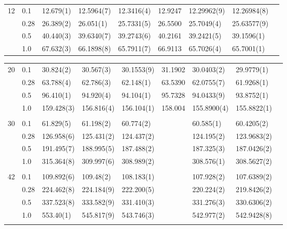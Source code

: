 {\begin{landscape}
\begin{table}
\begin{tabularx}{\hsize}{llR{2.65cm}R{2.65cm}R{2.65cm}R{2.65cm}R{2.65cm}R{2.65cm}R{2.65cm}}
				12 & 0.1 & 12.679(1) & 12.5964(7) & 12.3416(4) & 12.9247 & 12.29962(9) & 12.26984(8) \\ 
				& 0.28 & 26.389(2) & 26.051(1) & 25.7331(5) & 26.5500 & 25.7049(4) & 25.63577(9) \\
				& 0.5 & 40.440(3) & 39.6340(7) & 39.2743(6) & 40.2161 & 39.2421(5) & 39.1596(1) \\
				& 1.0 & 67.632(3) & 66.1898(8) & 65.7911(7) & 66.9113 & 65.7026(4) & 65.7001(1) \\ \hline
			\end{tabularx}
		\end{table}
		
		\begin{table}
			\label{tab:quantumdotswinteraction2D2}
			\begin{tabularx}{\hsize}{llR{2.65cm}R{2.65cm}R{2.65cm}R{2.65cm}R{2.65cm}R{2.65cm}R{2.65cm}} \\
				20 & 0.1 & 30.824(2) & 30.567(3) & 30.1553(9) & 31.1902 & 30.0403(2) & 29.9779(1) \\ 
				& 0.28 & 63.788(4) & 62.786(3) & 62.148(1) & 63.5390 & 62.0755(7) & 61.9268(1) \\
				& 0.5 & 96.410(1) & 94.920(4) & 94.104(1) & 95.7328 & 94.0433(9) & 93.8752(1) \\
				& 1.0 & 159.428(3) & 156.816(4) & 156.104(1) & 158.004 & 155.8900(4) & 155.8822(1) & \phantom{=} \\ 
				\hline \\
				
				30 & 0.1 & 61.829(5) & 61.198(2) & 60.774(2) & & 60.585(1) & 60.4205(2) \\ 
				& 0.28 & 126.958(6) & 125.431(2) & 124.437(2) & & 124.195(2) & 123.9683(2) \\
				& 0.5 & 191.495(7) & 188.995(5) & 187.488(2) & & 187.325(3) & 187.0426(2) \\
				& 1.0 & 315.364(8) & 309.997(6) & 308.989(2) & & 308.576(1) & 308.5627(2) \\ \hline \\
				
				42 & 0.1 & 109.892(6) & 109.48(2) & 108.183(1) & &  107.928(2) & 107.6389(2) \\ 
				& 0.28 & 224.462(8) & 224.184(9) & 222.200(5) & & 220.224(2) & 219.8426(2) \\
				& 0.5 & 337.523(8) & 333.582(9) & 331.410(3) & & 331.276(3) & 330.6306(2) \\
				& 1.0 & 553.40(1) & 545.817(9) & 543.746(3) & & 542.977(2) & 542.9428(8) \\ \hline \\
				

\end{tabularx}
\end{table}
\end{landscape}}
